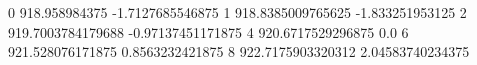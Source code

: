 0 918.958984375 -1.7127685546875
1 918.8385009765625 -1.833251953125
2 919.7003784179688 -0.97137451171875
4 920.6717529296875 0.0
6 921.528076171875 0.8563232421875
8 922.7175903320312 2.04583740234375
